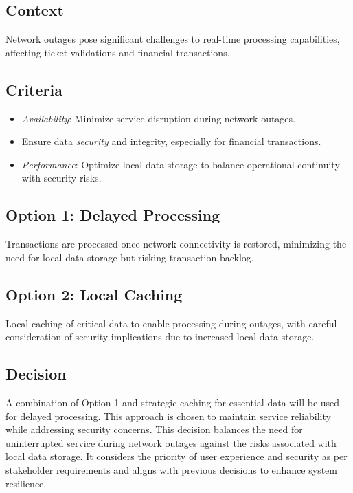 \subsection*{Context}
Network outages pose significant challenges to real-time processing capabilities, affecting ticket validations and financial transactions.

\subsection*{Criteria}
\begin{itemize}[noitemsep]
    \item \textit{Availability}: Minimize service disruption during network outages.
    \item Ensure data \textit{security} and integrity, especially for financial transactions.
    \item \textit{Performance}: Optimize local data storage to balance operational continuity with security risks.
\end{itemize}

\subsection*{Option 1: Delayed Processing}
Transactions are processed once network connectivity is restored, minimizing the need for local data storage but risking transaction backlog.

\subsection*{Option 2: Local Caching}
Local caching of critical data to enable processing during outages, with careful consideration of security implications due to increased local data storage.

\subsection*{Decision}
A combination of Option 1 and strategic caching for essential data will be used for delayed processing. This approach is chosen to maintain service reliability while addressing security concerns.
This decision balances the need for uninterrupted service during network outages against the risks associated with local data storage. It considers the priority of user experience and security as per stakeholder requirements and aligns with previous decisions to enhance system resilience.

